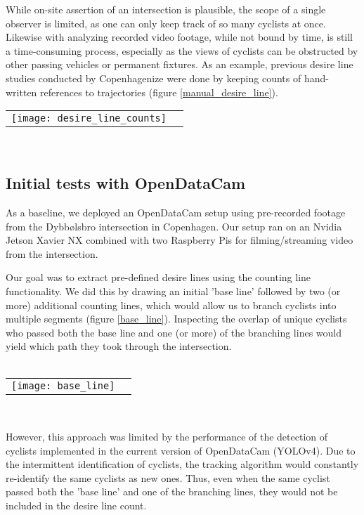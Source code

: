 While on-site assertion of an intersection is plausible, the scope of a single observer is limited, as one can only keep track of 
so many cyclists at once. Likewise with analyzing recorded video footage, while not bound by time, is still a time-consuming process, 
especially as the views of cyclists can be obstructed by other passing vehicles or permanent fixtures. 
As an example, previous desire line studies conducted by Copenhagenize were done by keeping counts of hand-written references to trajectories (figure \ref{manual_desire_line}).
\ \\

\raggedbottom
\noindent
\begin{tabular}{@{}cc}
\texttt{[image: desire\_line\_counts]} 
\end{tabular}
\label{manual_desire_line}
\

\subsection{Initial tests with OpenDataCam}
As a baseline, we deployed an OpenDataCam setup using pre-recorded footage from the Dybbølsbro intersection in Copenhagen.
Our setup ran on an Nvidia Jetson Xavier NX combined with two Raspberry Pis for filming/streaming video from the intersection.

Our goal was to extract pre-defined desire lines using the counting line functionality. We did this by drawing an initial 
'base line' followed by two (or more) additional counting lines, which would allow us to branch cyclists into multiple segments (figure \ref{base_line}). Inspecting the
overlap of unique cyclists who passed both the base line and one (or more) of the branching lines would yield which path
they took through the intersection. 
\ \\

\ \\
\raggedbottom
\noindent
\begin{tabular}{@{}cc}
\texttt{[image: base\_line]} 
\end{tabular}
\label{base_line}
\

However, this approach was limited by the performance of the detection of cyclists implemented in the current 
version of OpenDataCam (YOLOv4). Due to the intermittent identification of cyclists, the tracking algorithm would constantly 
re-identify the same cyclists as new ones. Thus, even when the same cyclist passed both the 'base line' and one of the 
branching lines, they would not be included in the desire line count.
\ \\
 

